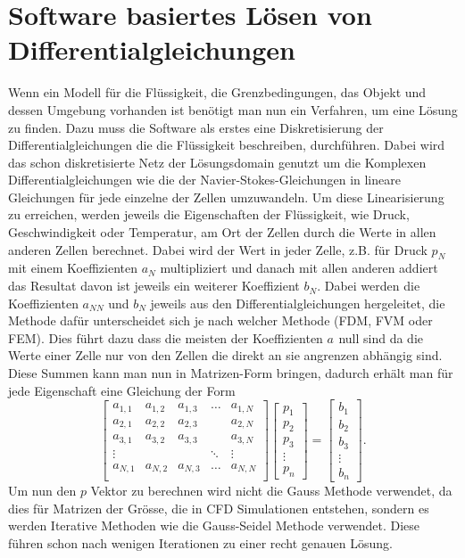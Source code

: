 \section{Software basiertes Lösen von Differentialgleichungen}
Wenn ein Modell für die Flüssigkeit, die Grenzbedingungen, das Objekt und dessen Umgebung vorhanden ist benötigt man nun ein Verfahren, um eine Lösung zu finden. 
Dazu muss die Software als erstes eine Diskretisierung der Differentialgleichungen die die Flüssigkeit beschreiben, durchführen.
Dabei wird das schon diskretisierte Netz der Lösungsdomain genutzt um die Komplexen Differentialgleichungen wie die der Navier-Stokes-Gleichungen in lineare Gleichungen für jede einzelne der Zellen umzuwandeln.
Um diese Linearisierung zu erreichen, werden jeweils die Eigenschaften der Flüssigkeit, wie Druck, Geschwindigkeit oder Temperatur, am Ort der Zellen durch die Werte in allen anderen Zellen berechnet.
Dabei wird der Wert in jeder Zelle, z.B. für Druck $p_N$ mit einem Koeffizienten $ a_{N} $ multipliziert und danach mit allen anderen addiert das Resultat davon ist jeweils ein weiterer Koeffizient $b_N$.
Dabei werden die Koeffizienten $a_{NN}$ und $b_{N }$ jeweils aus den Differentialgleichungen hergeleitet, die Methode dafür unterscheidet sich je nach welcher Methode (FDM, FVM oder FEM).
Dies führt dazu dass die meisten der Koeffizienten $a_{}$ null sind da die Werte einer Zelle nur von den Zellen die direkt an sie angrenzen abhängig sind.
Diese Summen kann man nun in Matrizen-Form bringen, dadurch erhält man für jede Eigenschaft eine Gleichung der Form
\begin{equation}
\begin{bmatrix}
	a_{1,1} &  a_{1,2} & a_{1,3} & \dots & a_{1,N} \\
	a_{2,1} &  a_{2,2} & a_{2,3} &  & a_{2,N} \\
	a_{3,1} &  a_{3,2} & a_{3,3} &  & a_{3,N} \\
	\vdots & &  & \ddots & \vdots \\
	a_{N,1} &  a_{N,2} & a_{N,3} & \dots & a_{N,N} \\
\end{bmatrix}
\begin{bmatrix}
	p_{1} \\
	p_{2} \\
	p_{3} \\
	\vdots \\
	p_{n}
\end{bmatrix}
= 
\begin{bmatrix}
b_{1} \\
b_{2} \\
b_{3} \\
\vdots \\
b_{n}
\end{bmatrix}
.
\end{equation}
Um nun den $p$ Vektor zu berechnen wird nicht die Gauss Methode verwendet, da dies für Matrizen der Grösse, die in CFD Simulationen entstehen, sondern es werden Iterative Methoden wie die Gauss-Seidel Methode verwendet.
Diese führen schon nach wenigen Iterationen zu einer recht genauen Lösung.